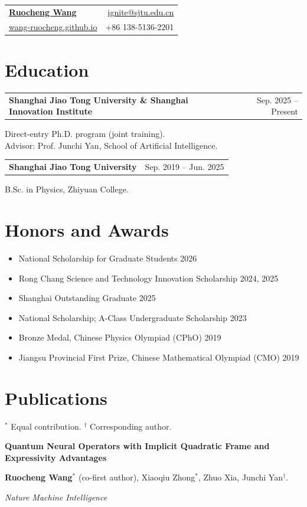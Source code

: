 \documentclass[letterpaper,11pt]{article}
\makeatletter
\newcommand{\education}[3]{%
  \begin{tabularx}{\textwidth}{@{}Xr@{}}
    \textbf{#1} & #2 \\
  \end{tabularx}\par
  #3\par\vspace{5pt}
}
\newcommand{\publication}[3]{%
  \begingroup
  \setlength{\parskip}{0pt}
  \textbf{#1}\par
  #2\par
  \textit{#3}\par
  \endgroup\vspace{5pt}
}
\makeatother
\begin{document}
\small

\begin{tabularx}{\textwidth}{@{}Xr@{}}
  \href{https://wang-ruocheng.github.io/}{\LARGE\textbf{Ruocheng Wang}} &
  \href{mailto:ignite@sjtu.edu.cn}{ignite@sjtu.edu.cn} \\
  \href{https://wang-ruocheng.github.io/}{wang-ruocheng.github.io} &
  +86 138-5136-2201
\end{tabularx}

\section{Education}
\education{Shanghai Jiao Tong University \& Shanghai Innovation Institute}
  {Sep. 2025 -- Present}
  {Direct-entry Ph.D. program (joint training).\\
   Advisor: Prof. Junchi Yan, School of Artificial Intelligence.}
\education{Shanghai Jiao Tong University}
  {Sep. 2019 -- Jun. 2025}
  {B.Sc. in Physics, Zhiyuan College.}

\section{Honors and Awards}
\begin{itemize}[itemsep=0pt,topsep=1pt]
  \item National Scholarship for Graduate Students \hfill 2026
  \item Rong Chang Science and Technology Innovation Scholarship \hfill 2024, 2025
  \item Shanghai Outstanding Graduate \hfill 2025
  \item National Scholarship; A-Class Undergraduate Scholarship \hfill 2023
  \item Bronze Medal, Chinese Physics Olympiad (CPhO) \hfill 2019
  \item Jiangsu Provincial First Prize, Chinese Mathematical Olympiad (CMO) \hfill 2019
\end{itemize}

\section{Publications}
{\footnotesize $^*$ Equal contribution. \quad $^\dagger$ Corresponding author.}\par\vspace{4pt}

\publication
  {Quantum Neural Operators with Implicit Quadratic Frame and Expressivity Advantages}
  {\textbf{Ruocheng Wang}$^*$ (co-first author), Xiaoqiu Zhong$^*$, Zhuo Xia, Junchi Yan$^\dagger$.}
  {Nature Machine Intelligence}
\end{document}

